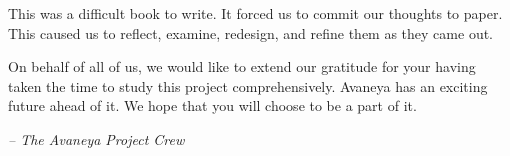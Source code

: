 

This was a difficult book to write. It forced us to commit our thoughts to paper. This caused us to reflect, examine, redesign, and refine them as they came out.

On behalf of all of us, we would like to extend our gratitude for your having taken the time to study this project comprehensively. Avaneya has an exciting future ahead of it. We hope that you will choose to be a part of it. 

\hskip 1.5cm {\it -- The Avaneya Project Crew}

\StopChapter

